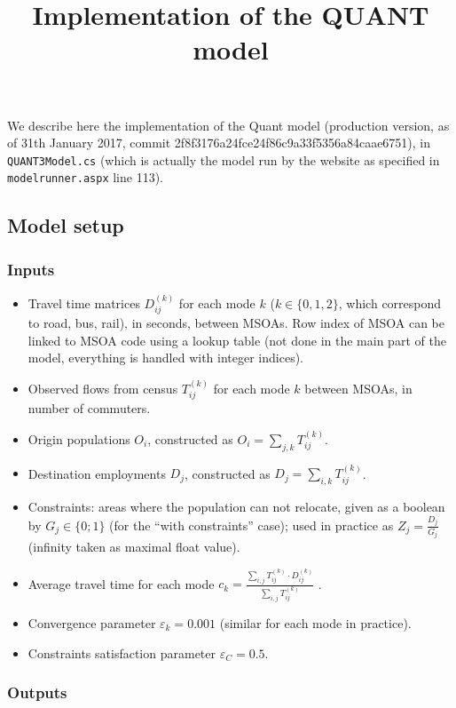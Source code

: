 \documentclass{article}
\title{Implementation of the QUANT model}
\author{}
\date{}
\begin{document}
\maketitle

We describe here the implementation of the Quant model (production version, as of 31th January 2017, commit 2f8f3176a24fce24f86c9a33f5356a84caae6751), in \texttt{QUANT3Model.cs} (which is actually the model run by the website as specified in \texttt{modelrunner.aspx} line 113).


\subsection*{Model setup}

\subsubsection*{Inputs}

\begin{itemize}
    \item Travel time matrices $D^{(k)}_{ij}$ for each mode $k$ ($k \in \{0,1,2\}$, which correspond to road, bus, rail), in seconds, between MSOAs. Row index of MSOA can be linked to MSOA code using a lookup table (not done in the main part of the model, everything is handled with integer indices).
    \item Observed flows from census $T^{(k)}_{ij}$ for each mode $k$ between MSOAs, in number of commuters.
    \item Origin populations $O_i$, constructed as $O_i = \sum_{j,k} T^{(k)}_{ij}$.
    \item Destination employments $D_j$, constructed as $D_j = \sum_{i,k} T^{(k)}_{ij}$.
    \item Constraints: areas where the population can not relocate, given as a boolean by $G_j \in \{0;1\}$ (for the ``with constraints'' case); used in practice as $Z_j = \frac{D_j}{G_j}$ (infinity taken as maximal float value).
    \item Average travel time for each mode $c_k = \frac{\sum_{i,j} T^{(k)}_{ij} \cdot D^{(k)}_{ij}}{\sum_{i,j} T^{(k)}_{ij}}$ .
    \item Convergence parameter $\varepsilon_k = 0.001$ (similar for each mode in practice).
    \item Constraints satisfaction parameter $\varepsilon_C = 0.5$.
\end{itemize}

\subsubsection*{Outputs}
\end{document}
